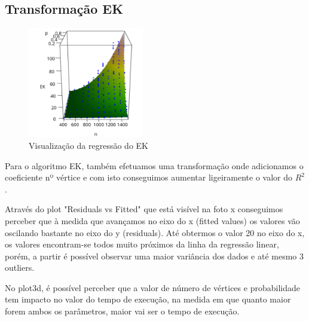 \documentclass{uofa-eng-assignment}
\begin{document}
\subsection{Transformação EK}

\begin{figure}
\centering
\includegraphics[width=0.45\textwidth]{plot3d_ek.png}
\caption{Visualização da regressão do EK}
\label{fig:plot3d-ek}
\end{figure}

Para o algoritmo EK, também efetuamos uma transformação onde adicionamos o coeficiente nº vértice e com isto conseguimos aumentar ligeiramente o valor do $R^2$.

Através do plot "Residuals vs Fitted" que está visível na foto x conseguimos perceber que à medida que avançamos no eixo do x (fitted values) os valores vão oscilando bastante no eixo do y (residuals). Até obtermos o valor 20 no eixo do x, os valores encontram-se todos muito próximos da linha da regressão linear, porém, a partir é possível observar uma maior variância dos dados e até mesmo 3 outliers.

No plot3d, é possível perceber que a valor de número de vértices e probabilidade tem impacto no valor do tempo de execução, na medida em que quanto maior forem ambos os parâmetros, maior vai ser o tempo de execução.
\end{document}
